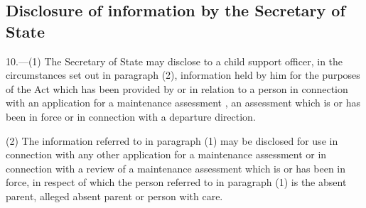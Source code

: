 \documentclass[a4paper,12pt]{article}
\begin{document}

%

\subsection[10. Disclosure of information by the Secretary of State]{Disclosure of information by the Secretary of State}

10.—(1) The Secretary of State may disclose to a child support officer, in the circumstances set out in paragraph (2), information held by him for the purposes of the Act which has been provided by or in relation to a person in connection with an application for a maintenance assessment%
, an assessment which is or has been in force or in connection with a departure direction.  %

(2) The information referred to in paragraph (1) may be disclosed for use in connection with any other application for a maintenance assessment or in connection with a review of a maintenance assessment which is or has been in force, in respect of which the person referred to in paragraph (1) is the absent parent, alleged absent parent or person with care.
\end{document}
